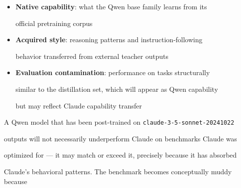 \begin{itemize}





  \item \textbf{Native capability}: what the Qwen base family learns from its





    official pretraining corpus





  \item \textbf{Acquired style}: reasoning patterns and instruction-following





    behavior transferred from external teacher outputs





  \item \textbf{Evaluation contamination}: performance on tasks structurally





    similar to the distillation set, which will appear as Qwen capability





    but may reflect Claude capability transfer





\end{itemize}











A Qwen model that has been post-trained on \texttt{claude-3-5-sonnet-20241022}





outputs will not necessarily underperform Claude on benchmarks Claude was





optimized for --- it may match or exceed it, precisely because it has absorbed





Claude's behavioral patterns. The benchmark becomes conceptually muddy because





